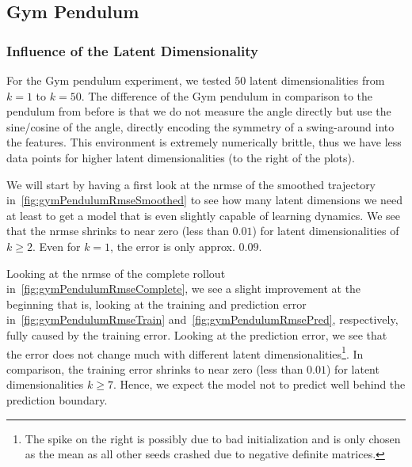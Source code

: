 	\subsection{Gym Pendulum} %
		\subsubsection{Influence of the Latent Dimensionality}
			\label{subsubsec:gymPendulumLatents}

			For the Gym pendulum experiment, we tested \(50\) latent dimensionalities from \( k = 1 \) to \( k = 50 \). The difference of the Gym pendulum in comparison to the pendulum from before is that we do not measure the angle directly but use the sine/cosine of the angle, directly encoding the symmetry of a swing-around into the features. This environment is extremely numerically brittle, thus we have less data points for higher latent dimensionalities (to the right of the plots).

			We will start by having a first look at the \ac{nrmse} of the smoothed trajectory in~\autoref{fig:gymPendulumRmseSmoothed} to see how many latent dimensions we need at least to get a model that is even slightly capable of learning dynamics. We see that the \ac{nrmse} shrinks to near zero (less than \( 0.01 \)) for latent dimensionalities of \( k \geq 2 \). Even for \( k = 1 \), the error is only approx. \( 0.09 \).

			Looking at the \ac{nrmse} of the complete rollout in~\autoref{fig:gymPendulumRmseComplete}, we see a slight improvement at the beginning that is, looking at the training and prediction error in~\autoref{fig:gymPendulumRmseTrain} and~\autoref{fig:gymPendulumRmsePred}, respectively, fully caused by the training error. Looking at the prediction error, we see that the error does not change much with different latent dimensionalities\footnote{The spike on the right is possibly due to bad initialization and is only chosen as the mean as all other seeds crashed due to negative definite matrices.}. In comparison, the training error shrinks to near zero (less than \( 0.01 \)) for latent dimensionalities \( k \geq 7 \). Hence, we expect the model not to predict well behind the prediction boundary.

